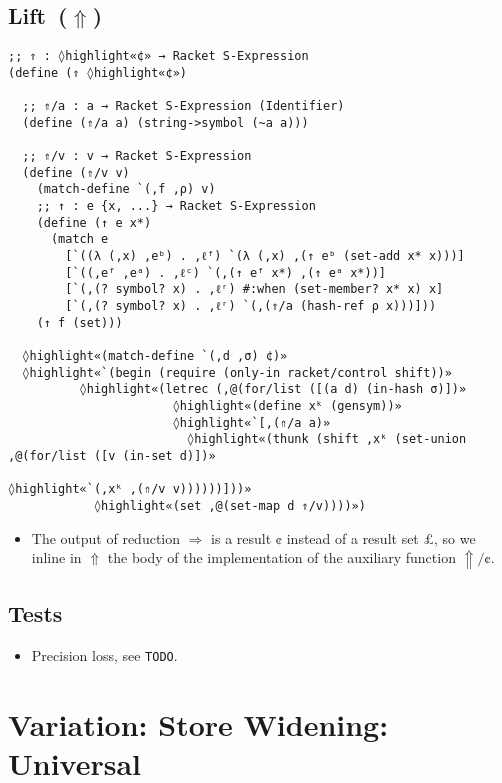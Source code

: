 \documentclass[12pt, oneside]{book}
\begin{document}
\subsection{Lift~(\(⇑\))}

\begin{Verbatim}
;; ⇑ : ◊highlight«¢» → Racket S-Expression
(define (⇑ ◊highlight«¢»)

  ;; ⇑/a : a → Racket S-Expression (Identifier)
  (define (⇑/a a) (string->symbol (~a a)))

  ;; ⇑/v : v → Racket S-Expression
  (define (⇑/v v)
    (match-define `(,f ,ρ) v)
    ;; ↑ : e {x, ...} → Racket S-Expression
    (define (↑ e x*)
      (match e
        [`((λ (,x) ,eᵇ) . ,ℓᶠ) `(λ (,x) ,(↑ eᵇ (set-add x* x)))]
        [`((,eᶠ ,eᵃ) . ,ℓᶜ) `(,(↑ eᶠ x*) ,(↑ eᵃ x*))]
        [`(,(? symbol? x) . ,ℓʳ) #:when (set-member? x* x) x]
        [`(,(? symbol? x) . ,ℓʳ) `(,(⇑/a (hash-ref ρ x)))]))
    (↑ f (set)))

  ◊highlight«(match-define `(,d ,σ) ¢)»
  ◊highlight«`(begin (require (only-in racket/control shift))»
          ◊highlight«(letrec (,@(for/list ([(a d) (in-hash σ)])»
                       ◊highlight«(define xᵏ (gensym))»
                       ◊highlight«`[,(⇑/a a)»
                         ◊highlight«(thunk (shift ,xᵏ (set-union ,@(for/list ([v (in-set d)])»
                                                          ◊highlight«`(,xᵏ ,(⇑/v v))))))]))»
            ◊highlight«(set ,@(set-map d ⇑/v))))»)
\end{Verbatim}

\begin{itemize}
  \item The output of reduction \(⇒\) is a result \(¢\) instead of a result set \(£\), so we inline in \(⇑\) the body of the implementation of the auxiliary function \(⇑/¢\).
\end{itemize}

\subsection{Tests}

\begin{itemize}
  \item Precision loss, see \texttt{TODO}.
\end{itemize}

\section{Variation: Store Widening: Universal}
\end{document}

